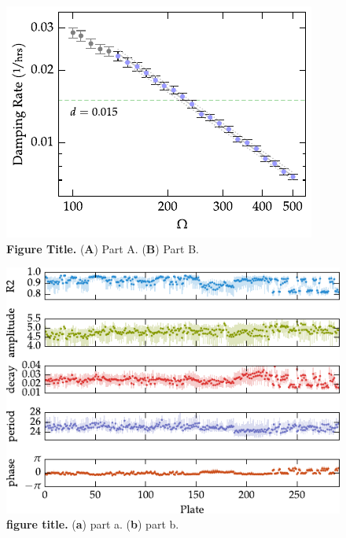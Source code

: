\documentclass[11pt, letterpaper]{article}
\begin{document}
\begin{figure}[tbp]
  \begin{center}
    \includegraphics[]{figures/pdfs/volume_calibration.pdf}
  \end{center}
  \caption{{\bfseries Figure Title.}
({\bfseries A}) Part A.
({\bfseries B}) Part B.}
\label{fig:vol_calibration}
\end{figure}

\begin{figure}[tbp]
  \begin{center}
    \includegraphics[]{figures/pdfs/zhang_plates.pdf}
  \end{center}
  \caption{{\bfseries figure title.}
({\bfseries a}) part a.
({\bfseries b}) part b.}
\label{fig:plate_variation}
\end{figure}
\end{document}
